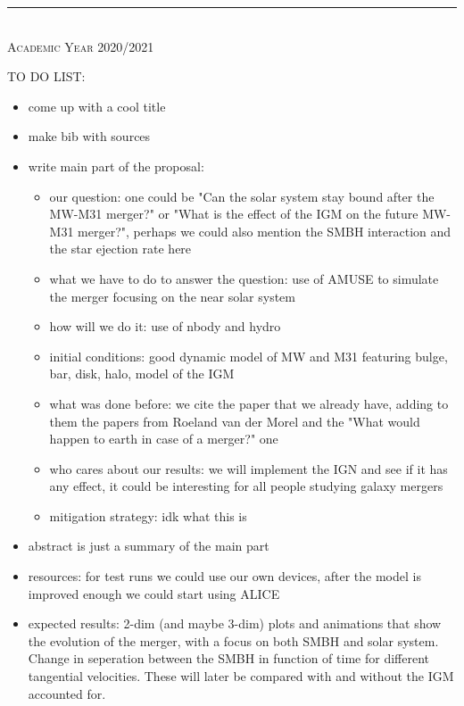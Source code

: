 \documentclass[11pt, english]{article}
\begin{document}
\begin{titlepage}
\begin{center}
\rule{125mm}{0.1mm} \\
\vspace{5pt}
\scshape{\large{Academic Year 2020/2021}} \\

\end{center}
\makeatother
\end{titlepage}

TO DO LIST:
\begin{itemize}
    \item come up with a cool title
    \item make bib with sources
    \item write main part of the proposal:
    \begin{itemize}
        \item our question: one could be "Can the solar system stay bound after the MW-M31 merger?" or "What is the effect of the IGM on the future MW-M31 merger?", perhaps we could also mention the SMBH interaction and the star ejection rate here
        \item what we have to do to answer the question: use of AMUSE to simulate the merger focusing on the near solar system
        \item how will we do it: use of nbody and hydro
        \item initial conditions: good dynamic model of MW and M31 featuring bulge, bar, disk, halo, model of the IGM
        \item what was done before: we cite the paper that we already have, adding to them the papers from Roeland van der Morel and the "What would happen to earth in case of a merger?" one
        \item who cares about our results: we will implement the IGN and see if it has any effect, it could be interesting for all people studying galaxy mergers
        \item mitigation strategy: idk what this is
    \end{itemize}
    \item abstract is just a summary of the main part
    \item resources: for test runs we could use our own devices, after the model is improved enough we could start using ALICE
    \item expected results: 2-dim (and maybe 3-dim) plots and animations that show the evolution of the merger, with a focus on both SMBH and solar system. Change in seperation between the SMBH in function of time for different tangential velocities. These will later be compared with and without the IGM accounted for.
\end{itemize}
\end{document}
